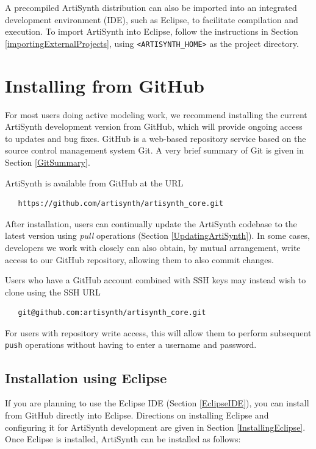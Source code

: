 A precompiled ArtiSynth distribution can also be imported into an
integrated development environment (IDE), such as Eclipse, to
facilitate compilation and execution. To import ArtiSynth into
Eclipse, follow the instructions in
Section \ref{importingExternalProjects}, using {\tt <ARTISYNTH\_HOME>}
as the project directory.

\section{Installing from GitHub}
\label{GitHubInstall}

For most users doing active modeling work, we recommend installing the
current ArtiSynth development version from GitHub, which will provide
ongoing access to updates and bug fixes.  GitHub is a web-based
repository service based on the source control management system
Git. A very brief summary of Git is given in Section \ref{GitSummary}.

ArtiSynth is available from GitHub at the URL
\begin{verbatim}
   https://github.com/artisynth/artisynth_core.git
\end{verbatim}
After installation, users can continually update the ArtiSynth
codebase to the latest version using {\it pull} operations
(Section \ref{UpdatingArtiSynth}).  In some cases, developers we work
with closely can also obtain, by mutual arrangement, write access to
our GitHub repository, allowing them to also commit changes.

\begin{sideblock}
Users who have a GitHub account combined with SSH keys may instead
wish to clone using the SSH URL
\begin{verbatim}
   git@github.com:artisynth/artisynth_core.git
\end{verbatim}
For users with repository write access, this will allow them to
perform subsequent {\tt push} operations without having to
enter a username and password.
\end{sideblock}

\subsection{Installation using Eclipse}
\label{EclipseInstallation}

If you are planning to use the Eclipse IDE (Section \ref{EclipseIDE}),
you can install from GitHub directly into Eclipse.  Directions on
installing Eclipse and configuring it for ArtiSynth development are
given in Section
\ref{InstallingEclipse}.
Once Eclipse is installed, ArtiSynth can be installed
as follows:

